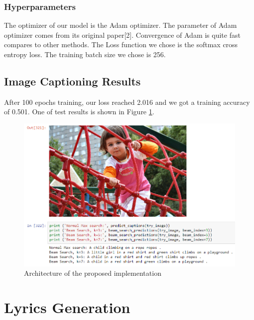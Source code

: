 \documentclass{article}
\begin{document}
\subsubsection{Hyperparameters}

The optimizer of our model is the Adam optimizer. The parameter of Adam optimizer comes from its original paper[2].  
Convergence of Adam is quite fast compares to other methods. The Loss function we chose is the softmax cross entropy loss. The training batch size we chose is 256. 

\subsection{Image Captioning Results}

After 100 epochs training, our loss reached 2.016 and we got a training accuracy of 0.501. One of test results is shown in Figure \ref{fig:3}. 

\begin{figure}[!ht]
\centering
\includegraphics[scale=0.65]{3.png}
\caption{Architecture of the proposed implementation}
\label{fig:3}
\end{figure}

\section{Lyrics Generation}
\label{sec:3}
\end{document}
